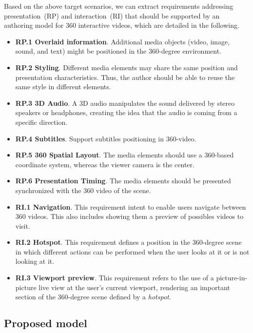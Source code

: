 Based on the above target scenarios, we can extract requirements addressing
presentation~(RP) and interaction~(RI) that should be
supported by an authoring model for 360 interactive videos, which are detailed
in the following.

\begin{itemize}
    \item \textbf{RP.1 Overlaid information}. Additional media objects
      (video, image, sound, and text) might be positioned in the 360-degree
      environment.
   \item \textbf{RP.2 Styling}. Different media elements may share the same
      position and presentation characteristics.
      Thus, the author should be able to reuse the same style in different
      elements.
  \item \textbf{RP.3 3D Audio}. A 3D audio manipulates the sound delivered by
    stereo speakers or headphones, creating the idea that the audio is coming
    from a specific direction.
  \item \textbf{RP.4 Subtitles}. Support subtitles positioning in 360-video.
  \item \textbf{RP.5 360 Spatial Layout}. The media elements should use a
    360-based coordinate system, whereas the viewer camera is the center.
  \item \textbf{RP.6 Presentation Timing}. The media elements should be
    presented synchronized with the 360 video of the scene. 
  \item \textbf{RI.1 Navigation}. This requirement intent to enable users
    navigate between 360 videos. This also includes showing them a preview of
    possibles videos to visit.
  \item \textbf{RI.2 Hotspot}. This requirement defines a position in the
    360-degree scene in which different actions can be performed when the user
    looks at it or is not looking at it.
  \item \textbf{RI.3 Viewport preview}. This requirement refers to the use of
    a picture-in-picture live view at the user's current viewport, rendering
    an important section of the 360-degree scene defined by a \emph{hotspot}.
\end{itemize}



\subsection{Proposed model}
\label{subsec:proposal}
 
